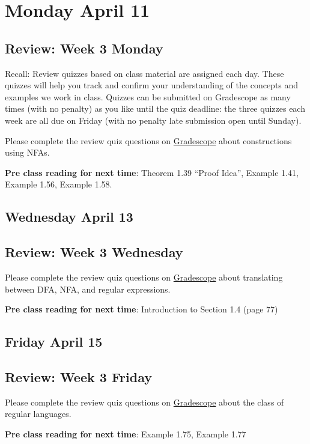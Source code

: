 

\section*{Monday April 11}


    
\subsection*{Review: Week 3 Monday}


Recall: Review quizzes based on class material are assigned each day. 
These quizzes will help you track and confirm your understanding of the concepts and examples 
we work in class. Quizzes can be submitted on Gradescope as many times (with no penalty) as 
you like until the quiz deadline: the three quizzes each week are all due on Friday (with no penalty 
late submission open until Sunday).

Please complete the review quiz questions on \href{http://gradescope.com}{Gradescope} about 
constructions using NFAs.

{\bf Pre class reading for next time}: Theorem 1.39 ``Proof Idea'', Example 1.41, Example 1.56, Example 1.58.


\newpage
\subsection*{Wednesday April 13}



\subsection*{Review: Week 3 Wednesday}

Please complete the review quiz questions on \href{http://gradescope.com}{Gradescope} about 
translating between DFA, NFA, and regular expressions.


{\bf Pre class reading for next time}: Introduction to Section 1.4 (page 77)



\newpage
\subsection*{Friday April 15}



\subsection*{Review: Week 3 Friday}


Please complete the review quiz questions on \href{http://gradescope.com}{Gradescope} about 
the class of regular languages.

{\bf Pre class reading for next time}: Example 1.75, Example 1.77
